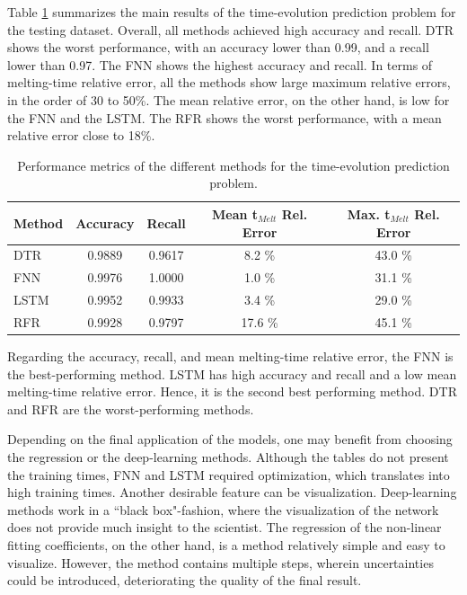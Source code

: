 Table \ref{tab:results-2} summarizes the main results of the time-evolution prediction problem for the testing dataset.
Overall, all methods achieved high accuracy and recall.
DTR shows the worst performance, with an accuracy lower than 0.99, and a recall lower than 0.97.
The FNN shows the highest accuracy and recall.
In terms of melting-time relative error, all the methods show large maximum relative errors, in the order of 30 to 50\%.
The mean relative error, on the other hand, is low for the FNN and the LSTM.
The RFR shows the worst performance, with a mean relative error close to 18\%.

\begin{table}[htbp!]
  \centering
  \caption{Performance metrics of the different methods for the time-evolution prediction problem.}
  \label{tab:results-2}
  \begin{tabular}{lcccc}
    \toprule
    Method & Accuracy & Recall & Mean t$_{Melt}$ Rel. Error & Max. t$_{Melt}$ Rel. Error \\
    \midrule
    DTR      & 0.9889 & 0.9617 &                     8.2 \% &                    43.0 \% \\
    FNN      & 0.9976 & 1.0000 &                     1.0 \% &                    31.1 \% \\
    LSTM     & 0.9952 & 0.9933 &                     3.4 \% &                    29.0 \% \\
    RFR      & 0.9928 & 0.9797 &                    17.6 \% &                    45.1 \% \\
    \bottomrule
  \end{tabular}
\end{table}

Regarding the accuracy, recall, and mean melting-time relative error, the FNN is the best-performing method.
LSTM has high accuracy and recall and a low mean melting-time relative error.
Hence, it is the second best performing method.
DTR and RFR are the worst-performing methods.

Depending on the final application of the models, one may benefit from choosing the regression or the deep-learning methods.
Although the tables do not present the training times, FNN and LSTM required optimization, which translates into high training times.
Another desirable feature can be visualization.
Deep-learning methods work in a ``black box"-fashion, where the visualization of the network does not provide much insight to the scientist.
The regression of the non-linear fitting coefficients, on the other hand, is a method relatively simple and easy to visualize.
However, the method contains multiple steps, wherein uncertainties could be introduced, deteriorating the quality of the final result.

